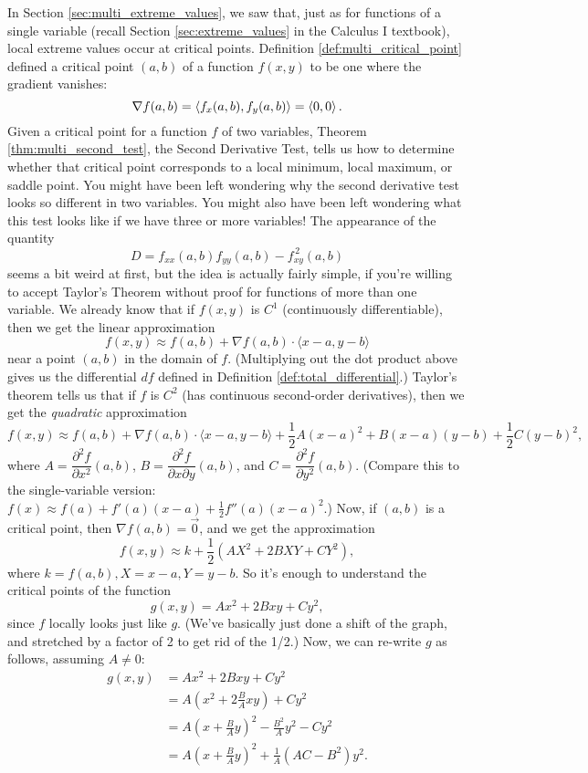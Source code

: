 In Section \ref{sec:multi_extreme_values}, we saw that, just as for functions of a single variable (recall Section \ref{sec:extreme_values} in the Calculus I textbook), local extreme values occur at critical points. 
Definition \ref{def:multi_critical_point} defined a critical point $(a,b)$ of a function $f(x,y)$  to be one where the gradient vanishes:
\[
\nabla f(a,b) = \left\langle f_x(a,b),f_y(a,b)\right\rangle = \left\langle 0,0\right\rangle.
\]
Given a critical point for a function $f$ of two variables, Theorem \ref{thm:multi_second_test}, the Second Derivative Test, tells us how to determine whether that critical point corresponds to a local minimum, local maximum, or saddle point. You might have been left wondering why the second derivative test looks so different in two variables. You might also have been left wondering what this test looks like if we have three or more variables!
The appearance of the quantity 
\[
D = f_{xx}(a,b)f_{yy}(a,b)-f_{xy}^{\,2}(a,b)
\]
seems a bit weird at first, but the idea is actually fairly simple, if you're willing to accept Taylor's Theorem without proof for functions of more than one variable. We already know that if $f(x,y)$ is $C^1$ (continuously differentiable), then we get the linear approximation
\[
f(x,y) \approx f(a,b) +\nabla f(a,b)\cdot\langle x-a,y-b\rangle
\]
near a point $(a,b)$ in the domain of $f$. (Multiplying out the dot product above gives us the differential $df$ defined in Definition \ref{def:total_differential}.) Taylor's theorem tells us that if $f$ is $C^2$ (has continuous second-order derivatives), then we get the {\em quadratic} approximation
\[
f(x,y) \approx f(a,b) + \nabla f(a,b)\cdot \langle x-a,y-b\rangle +\frac{1}{2}A(x-a)^2+B(x-a)(y-b)+\frac{1}{2}C(y-b)^2,
\]
where $A = \dfrac{\partial ^2 f}{\partial x^2}(a,b)$, $B = \dfrac{\partial^2 f}{\partial x\partial y}(a,b)$, and $C =\dfrac{\partial^2 f}{\partial y^2}(a,b)$. (Compare this to the single-variable version: $f(x)\approx f(a) + f'(a)(x-a)+\frac{1}{2}f''(a)(x-a)^2$.) Now, if $(a,b)$ is a critical point, then $\nabla f(a,b)=\vec{0}$, and we get the approximation
\[
f(x,y) \approx k+ \frac{1}{2}\left(AX^2+2BXY+CY^2\right),
\]
where $k=f(a,b), X=x-a, Y=y-b$. So it's enough to understand the critical points of the function
\[
g(x,y) = Ax^2+2Bxy+Cy^2,
\]
since $f$ locally looks just like $g$. (We've basically just done a shift of the graph, and stretched by a factor of 2 to get rid of the 1/2.) Now, we can re-write $g$ as follows, assuming $A\neq 0$:
\begin{align*}
g(x,y) & = Ax^2+2Bxy+Cy^2\\
& = A(x^2+2\frac{B}{A}xy) + Cy^2\\
& = A(x+\frac{B}{A}y)^2 - \frac{B^2}{A}y^2-Cy^2\\
& = A(x+\frac{B}{A}y)^2 + \frac{1}{A}(AC-B^2)y^2.
\end{align*}

